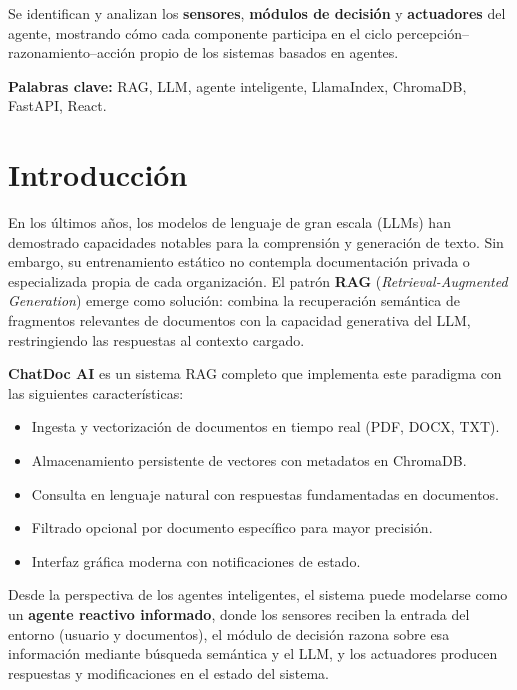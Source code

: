 \documentclass[12pt,a4paper]{article}
\begin{document}
Se identifican y analizan los \textbf{sensores}, \textbf{módulos de decisión} y \textbf{actuadores} del agente, mostrando cómo cada componente participa en el ciclo percepción–razonamiento–acción propio de los sistemas basados en agentes.

\medskip
\textbf{Palabras clave:} RAG, LLM, agente inteligente, LlamaIndex, ChromaDB, FastAPI, React.

\section{Introducción}

En los últimos años, los modelos de lenguaje de gran escala (LLMs) han demostrado capacidades notables para la comprensión y generación de texto. Sin embargo, su entrenamiento estático no contempla documentación privada o especializada propia de cada organización. El patrón \textbf{RAG} (\textit{Retrieval-Augmented Generation}) emerge como solución: combina la recuperación semántica de fragmentos relevantes de documentos con la capacidad generativa del LLM, restringiendo las respuestas al contexto cargado.

\textbf{ChatDoc AI} es un sistema RAG completo que implementa este paradigma con las siguientes características:

\begin{itemize}[leftmargin=1.5cm]
  \item Ingesta y vectorización de documentos en tiempo real (PDF, DOCX, TXT).
  \item Almacenamiento persistente de vectores con metadatos en ChromaDB.
  \item Consulta en lenguaje natural con respuestas fundamentadas en documentos.
  \item Filtrado opcional por documento específico para mayor precisión.
  \item Interfaz gráfica moderna con notificaciones de estado.
\end{itemize}

Desde la perspectiva de los agentes inteligentes, el sistema puede modelarse como un \textbf{agente reactivo informado}, donde los sensores reciben la entrada del entorno (usuario y documentos), el módulo de decisión razona sobre esa información mediante búsqueda semántica y el LLM, y los actuadores producen respuestas y modificaciones en el estado del sistema.
\end{document}
